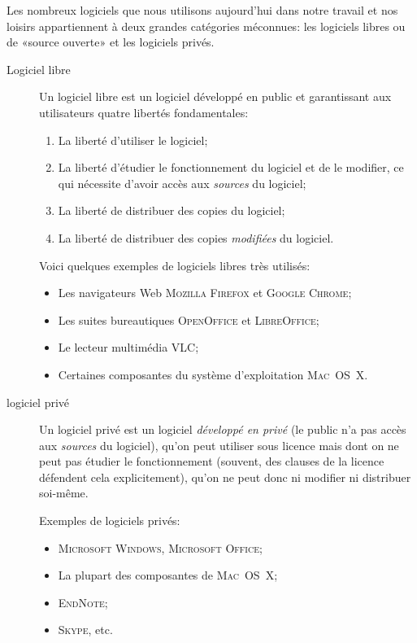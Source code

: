 \documentclass{article}
\newcommand\entite[1]{{\textsc{#1}}}
\begin{document}
Les nombreux logiciels que nous utilisons aujourd’hui dans notre travail et nos loisirs appartiennent à deux grandes catégories méconnues: les logiciels libres ou de «source ouverte» et les logiciels privés.

\begin{description}

\item[Logiciel libre] Un logiciel libre est un logiciel développé en public et garantissant aux utilisateurs quatre libertés fondamentales:

\begin{enumerate}
\item La liberté d’utiliser le logiciel;
\item La liberté d’étudier le fonctionnement du logiciel et de le modifier, ce qui nécessite d’avoir accès aux \emph{sources} du logiciel;
\item La liberté de distribuer des copies du logiciel;
\item La liberté de distribuer des copies \emph{modifiées} du logiciel.
\end{enumerate}

Voici quelques exemples de logiciels libres très utilisés:

\begin{itemize}
\item Les navigateurs Web \entite{Mozilla Firefox} et \entite{Google Chrome};
\item Les suites bureautiques \entite{OpenOffice} et \entite{LibreOffice};
\item Le lecteur multimédia \entite{VLC};
\item Certaines composantes du système d’exploitation \entite{Mac~OS~X}.
\end{itemize}

\item[logiciel privé] Un logiciel privé est un logiciel \emph{développé en privé} (le public n’a pas accès aux \emph{sources} du logiciel), qu’on peut utiliser sous licence mais dont on ne peut pas étudier le fonctionnement (souvent, des clauses de la licence défendent cela explicitement), qu’on ne peut donc ni modifier ni distribuer soi-même.

Exemples de logiciels privés:

\begin{itemize}
\item \entite{Microsoft Windows}, \entite{Microsoft Office};
\item La plupart des composantes de \entite{Mac~OS~X};
\item \entite{EndNote};
\item \entite{Skype}, etc.
\end{itemize}

\end{description}
\end{document}

